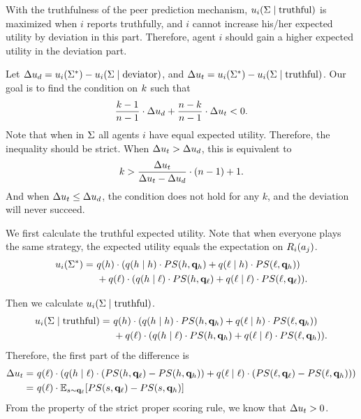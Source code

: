 With the truthfulness of the peer prediction mechanism, $u_i(\Sigma\mid \text{truthful})$ is maximized when $i$ reports truthfully, and $i$ cannot increase his/her expected utility by deviation in this part. Therefore, agent $i$ should gain a higher expected utility in the deviation part. 

Let $\Delta u_d = u_i(\Sigma^*) -u_i(\Sigma\mid \text{deviator})$, and $\Delta u_t = u_i(\Sigma^*) -u_i(\Sigma\mid \text{truthful})$. Our goal is to find the condition on $k$ such that
\begin{equation*}
    \frac{k-1}{n -1} \cdot\Delta u_d + \frac{n -k}{n -1} \cdot \Delta u_t< 0. 
\end{equation*}
Note that when in $\Sigma$ all agents $i$ have equal expected utility. Therefore, the inequality should be strict.
When $\Delta u_t > \Delta u_d$, this is equivalent to
\begin{equation*}
    k > \frac{\Delta u_t}{\Delta u_t - \Delta u_d}\cdot (n-1) + 1. 
\end{equation*}
And when $\Delta u_t \le \Delta u_d$, the condition does not hold for any $k$, and the deviation will never succeed. 

We first calculate the truthful expected utility. Note that when everyone plays the same strategy, the expected utility equals the expectation on $R_i(a_j)$.
\begin{align*}
    u_i(\Sigma^*) = &\ q(h) \cdot(q(h \mid h) \cdot PS(h, \mathbf{q}_h) + q(\ell \mid h) \cdot PS(\ell, \mathbf{q}_h))\\
    &\ + q(\ell) \cdot(q(h \mid \ell) \cdot PS(h, \mathbf{q}_\ell) + q(\ell \mid \ell) \cdot PS(\ell, \mathbf{q}_\ell)). 
\end{align*}

Then we calculate $u_i(\Sigma\mid \text{truthful})$.
\begin{align*}
    u_i(\Sigma\mid \text{truthful}) = &\ q(h) \cdot(q(h \mid h) \cdot PS(h, \mathbf{q}_h) + q(\ell \mid h) \cdot PS(\ell, \mathbf{q}_h))\\
    &\ + q(\ell) \cdot(q(h \mid \ell) \cdot PS(h, \mathbf{q}_h) + q(\ell \mid \ell) \cdot PS(\ell, \mathbf{q}_h)). 
\end{align*}
Therefore, the first part of the difference is
\begin{align*}
   \Delta u_t = &\ q(\ell) \cdot(q(h \mid \ell) \cdot (PS(h, \mathbf{q}_\ell) -PS(h, \mathbf{q}_h)) + q(\ell \mid \ell) \cdot (PS(\ell, \mathbf{q}_\ell) - PS(\ell, \mathbf{q}_h)))\\
    =&\ q(\ell)\cdot \mathbb{E}_{s\sim \mathbf{q}_{\ell}}[PS(s, \mathbf{q}_{\ell}) - PS(s, \mathbf{q}_{h})]
\end{align*}
From the property of the strict proper scoring rule, we know that $\Delta u_t > 0$. 

